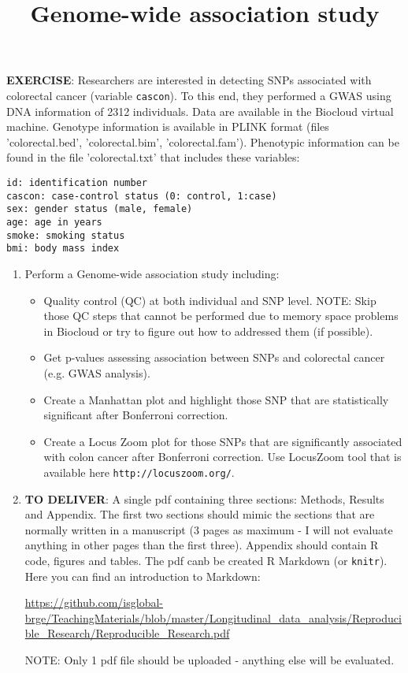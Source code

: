 \documentclass[11pt]{article}
\begin{document}
\title{\bf Genome-wide association study}
\date{}


\maketitle


\noindent \textbf{EXERCISE}: Researchers are interested in detecting  SNPs associated
with colorectal cancer (variable {\tt cascon}). To this end, they performed a GWAS using DNA information of 2312 individuals. Data are available in the Biocloud virtual machine. Genotype information is available in PLINK format (files 'colorectal.bed', 'colorectal.bim', 'colorectal.fam'). Phenotypic information can be found in the file 'colorectal.txt' that includes these variables:

\begin{verbatim}
id: identification number
cascon: case-control status (0: control, 1:case)
sex: gender status (male, female)
age: age in years
smoke: smoking status
bmi: body mass index
\end{verbatim}

\begin{enumerate}

\item Perform a Genome-wide association study including: 

\begin{itemize}
\item Quality control (QC) at both individual and SNP level. NOTE: Skip those QC steps that cannot be performed due to memory space problems in Biocloud or try to figure out how to addressed them (if possible).  
\item Get p-values assessing association between SNPs and colorectal cancer (e.g. GWAS analysis).
\item Create a Manhattan plot and highlight those SNP that are statistically significant after Bonferroni correction. 
\item Create a Locus Zoom plot for those SNPs that are significantly associated with colon cancer after Bonferroni correction. Use LocusZoom tool that is available here {\tt http://locuszoom.org/}.
\end{itemize}


\item \noindent \textbf{TO DELIVER}: A single pdf containing three sections: Methods, Results and Appendix. The first two sections should mimic the sections that are normally written in a manuscript (3 pages as maximum - I will not evaluate anything in other pages than the first three). Appendix should contain R code, figures and tables. The pdf canb be created  R Markdown (or {\tt knitr}). Here you can find an introduction to Markdown: 

\noindent \url{https://github.com/isglobal-brge/TeachingMaterials/blob/master/Longitudinal\_data\_analysis/Reproducible\_Research/Reproducible\_Research.pdf}

NOTE: Only 1 pdf file should be uploaded - anything else will be evaluated.
\end{enumerate}
\end{document}

